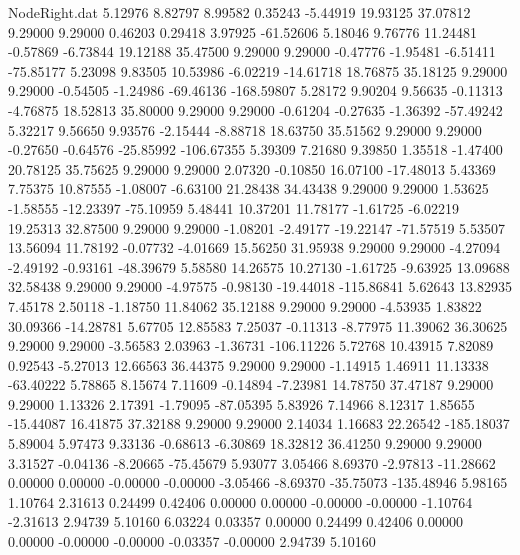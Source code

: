 \begin{filecontents}{NodeRight.dat}
   5.12976    8.82797    8.99582     0.35243   -5.44919   19.93125   37.07812    9.29000    9.29000    0.46203    0.29418    3.97925  -61.52606
   5.18046    9.76776   11.24481    -0.57869   -6.73844   19.12188   35.47500    9.29000    9.29000   -0.47776   -1.95481   -6.51411  -75.85177
   5.23098    9.83505   10.53986    -6.02219  -14.61718   18.76875   35.18125    9.29000    9.29000   -0.54505   -1.24986  -69.46136 -168.59807
   5.28172    9.90204    9.56635    -0.11313   -4.76875   18.52813   35.80000    9.29000    9.29000   -0.61204   -0.27635   -1.36392  -57.49242
   5.32217    9.56650    9.93576    -2.15444   -8.88718   18.63750   35.51562    9.29000    9.29000   -0.27650   -0.64576  -25.85992 -106.67355
   5.39309    7.21680    9.39850     1.35518   -1.47400   20.78125   35.75625    9.29000    9.29000    2.07320   -0.10850   16.07100  -17.48013
   5.43369    7.75375   10.87555    -1.08007   -6.63100   21.28438   34.43438    9.29000    9.29000    1.53625   -1.58555  -12.23397  -75.10959
   5.48441   10.37201   11.78177    -1.61725   -6.02219   19.25313   32.87500    9.29000    9.29000   -1.08201   -2.49177  -19.22147  -71.57519
   5.53507   13.56094   11.78192    -0.07732   -4.01669   15.56250   31.95938    9.29000    9.29000   -4.27094   -2.49192   -0.93161  -48.39679
   5.58580   14.26575   10.27130    -1.61725   -9.63925   13.09688   32.58438    9.29000    9.29000   -4.97575   -0.98130  -19.44018 -115.86841
   5.62643   13.82935    7.45178     2.50118   -1.18750   11.84062   35.12188    9.29000    9.29000   -4.53935    1.83822   30.09366  -14.28781
   5.67705   12.85583    7.25037    -0.11313   -8.77975   11.39062   36.30625    9.29000    9.29000   -3.56583    2.03963   -1.36731 -106.11226
   5.72768   10.43915    7.82089     0.92543   -5.27013   12.66563   36.44375    9.29000    9.29000   -1.14915    1.46911   11.13338  -63.40222
   5.78865    8.15674    7.11609    -0.14894   -7.23981   14.78750   37.47187    9.29000    9.29000    1.13326    2.17391   -1.79095  -87.05395
   5.83926    7.14966    8.12317     1.85655  -15.44087   16.41875   37.32188    9.29000    9.29000    2.14034    1.16683   22.26542 -185.18037
   5.89004    5.97473    9.33136    -0.68613   -6.30869   18.32812   36.41250    9.29000    9.29000    3.31527   -0.04136   -8.20665  -75.45679
   5.93077    3.05466    8.69370    -2.97813  -11.28662    0.00000    0.00000   -0.00000   -0.00000   -3.05466   -8.69370  -35.75073 -135.48946
   5.98165    1.10764    2.31613     0.24499    0.42406    0.00000    0.00000   -0.00000   -0.00000   -1.10764   -2.31613    2.94739    5.10160
   6.03224    0.03357    0.00000     0.24499    0.42406    0.00000    0.00000   -0.00000   -0.00000   -0.03357   -0.00000    2.94739    5.10160

\end{filecontents}
